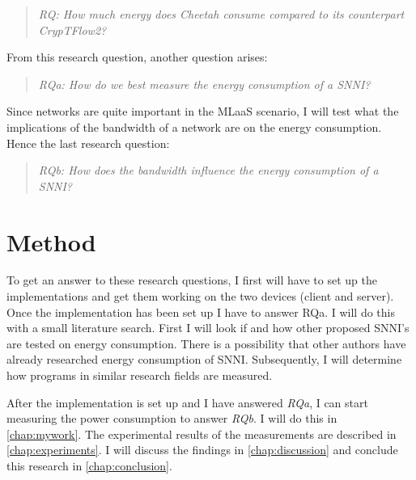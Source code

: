 \documentclass[../thesis.tex]{subfiles}
\begin{document}
\begin{quote} \emph{RQ: How much energy does Cheetah consume compared to its counterpart CrypTFlow2?} \end{quote} 

\noindent From this research question, another question arises:

\begin{quote} \emph{RQa: How do we best measure the energy consumption of a SNNI?} \end{quote}

\noindent Since networks are quite important in the MLaaS scenario, I will test what the implications of the bandwidth of a network are on the energy consumption. Hence the last research question:

\begin{quote}
    \emph{RQb: How does the bandwidth influence the energy consumption of a SNNI?}
\end{quote}


\section{Method}
To get an answer to these research questions, I first will have to set up the implementations and get them working on the two devices (client and server). Once the implementation has been set up I have to answer RQa. I will do this with a small literature search. First I will look if and how other proposed SNNI's are tested on energy consumption. There is a possibility that other authors have already researched energy consumption of SNNI. Subsequently, I will determine how programs in similar research fields are measured.

After the implementation is set up and I have answered \textit{RQa}, I can start measuring the power consumption to answer \textit{RQb}. I will do this in \autoref{chap:mywork}. The experimental results of the measurements are described in \autoref{chap:experiments}. I will discuss the findings in \autoref{chap:discussion} and conclude this research in \autoref{chap:conclusion}.

\end{document}
